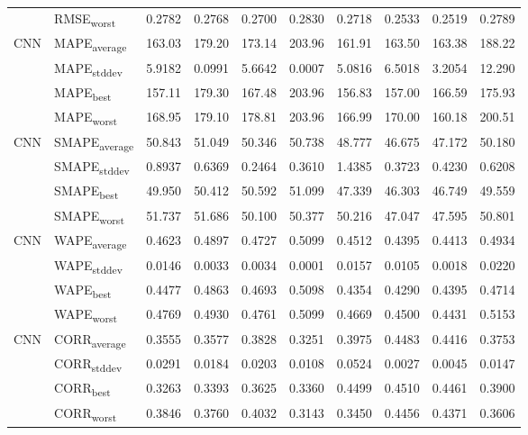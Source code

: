 {\begin{longtable}{l l c c c c c c c c}
 & RMSE\textsubscript{worst} & 0.2782 & 0.2768 & 0.2700 & 0.2830 & 0.2718 & 0.2533 & 0.2519 & 0.2789 \\
\cmidrule(lr){2-10}
\multirow{4}{*}{CNN} & MAPE\textsubscript{average} & 163.03 & 179.20 & 173.14 & 203.96 & 161.91 & 163.50 & 163.38 & 188.22 \\
 & MAPE\textsubscript{stddev} & 5.9182 & 0.0991 & 5.6642 & 0.0007 & 5.0816 & 6.5018 & 3.2054 & 12.290 \\
 & MAPE\textsubscript{best} & 157.11 & 179.30 & 167.48 & 203.96 & 156.83 & 157.00 & 166.59 & 175.93 \\
 & MAPE\textsubscript{worst} & 168.95 & 179.10 & 178.81 & 203.96 & 166.99 & 170.00 & 160.18 & 200.51 \\
\cmidrule(lr){2-10}
\multirow{4}{*}{CNN} & SMAPE\textsubscript{average} & 50.843 & 51.049 & 50.346 & 50.738 & 48.777 & 46.675 & 47.172 & 50.180 \\
 & SMAPE\textsubscript{stddev} & 0.8937 & 0.6369 & 0.2464 & 0.3610 & 1.4385 & 0.3723 & 0.4230 & 0.6208 \\
 & SMAPE\textsubscript{best} & 49.950 & 50.412 & 50.592 & 51.099 & 47.339 & 46.303 & 46.749 & 49.559 \\
 & SMAPE\textsubscript{worst} & 51.737 & 51.686 & 50.100 & 50.377 & 50.216 & 47.047 & 47.595 & 50.801 \\
\cmidrule(lr){2-10}
\multirow{4}{*}{CNN} & WAPE\textsubscript{average} & 0.4623 & 0.4897 & 0.4727 & 0.5099 & 0.4512 & 0.4395 & 0.4413 & 0.4934 \\
 & WAPE\textsubscript{stddev} & 0.0146 & 0.0033 & 0.0034 & 0.0001 & 0.0157 & 0.0105 & 0.0018 & 0.0220 \\
 & WAPE\textsubscript{best} & 0.4477 & 0.4863 & 0.4693 & 0.5098 & 0.4354 & 0.4290 & 0.4395 & 0.4714 \\
 & WAPE\textsubscript{worst} & 0.4769 & 0.4930 & 0.4761 & 0.5099 & 0.4669 & 0.4500 & 0.4431 & 0.5153 \\
\cmidrule(lr){2-10}
\multirow{4}{*}{CNN} & CORR\textsubscript{average} & 0.3555 & 0.3577 & 0.3828 & 0.3251 & 0.3975 & 0.4483 & 0.4416 & 0.3753 \\
 & CORR\textsubscript{stddev} & 0.0291 & 0.0184 & 0.0203 & 0.0108 & 0.0524 & 0.0027 & 0.0045 & 0.0147 \\
 & CORR\textsubscript{best} & 0.3263 & 0.3393 & 0.3625 & 0.3360 & 0.4499 & 0.4510 & 0.4461 & 0.3900 \\
 & CORR\textsubscript{worst} & 0.3846 & 0.3760 & 0.4032 & 0.3143 & 0.3450 & 0.4456 & 0.4371 & 0.3606 \\

\end{longtable}}

